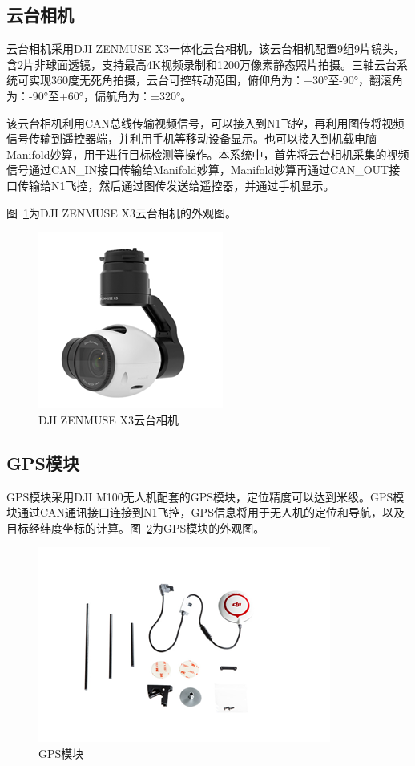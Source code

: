 \subsection{云台相机}
云台相机采用DJI ZENMUSE X3一体化云台相机，该云台相机配置9组9片镜头，含2片非球面透镜，支持最高4K视频录制和1200万像素静态照片拍摄。三轴云台系统可实现360度无死角拍摄，云台可控转动范围，俯仰角为：+30°至-90°，翻滚角为：-90°至+60°，偏航角为：±320°。

该云台相机利用CAN总线传输视频信号，可以接入到N1飞控，再利用图传将视频信号传输到遥控器端，并利用手机等移动设备显示。也可以接入到机载电脑Manifold妙算，用于进行目标检测等操作。本系统中，首先将云台相机采集的视频信号通过CAN\_IN接口传输给Manifold妙算，Manifold妙算再通过CAN\_OUT接口传输给N1飞控，然后通过图传发送给遥控器，并通过手机显示。

图~\ref{fig:2-4}为DJI ZENMUSE X3云台相机的外观图。

\begin{figure}[htb]
	\centering
	\includegraphics[width=0.4\linewidth]{figures/2-4.png}
	\caption{DJI ZENMUSE X3云台相机}
	\label{fig:2-4}
\end{figure}

\subsection{GPS模块}
GPS模块采用DJI M100无人机配套的GPS模块，定位精度可以达到米级。GPS模块通过CAN通讯接口连接到N1飞控，GPS信息将用于无人机的定位和导航，以及目标经纬度坐标的计算。图~\ref{fig:2-5}为GPS模块的外观图。

\begin{figure}[htb]
	\centering
	\includegraphics[width=0.6\linewidth]{figures/2-5.png}
	\caption{GPS模块}
	\label{fig:2-5}
\end{figure}

